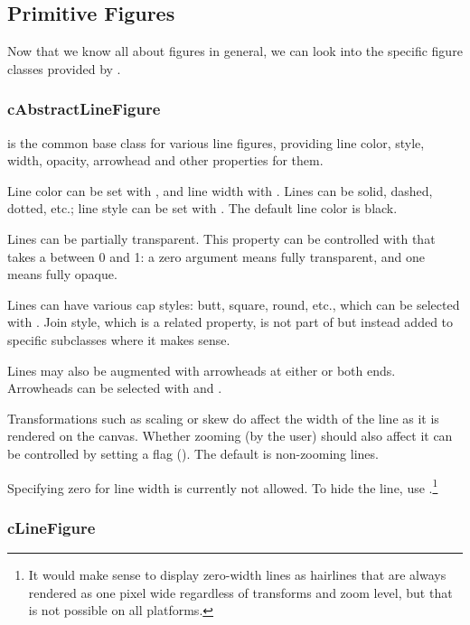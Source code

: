 \subsection{Primitive Figures}
\label{sec:graphics:primitive-figures}

Now that we know all about figures in general, we can look into the
specific figure classes provided by {\opp}.

\subsubsection{cAbstractLineFigure}
\label{sec:graphics:abstractlinefigure}

 is the common base class for various line
figures, providing line color, style, width, opacity, arrowhead and other
properties for them.

Line color can be set with , and line width with
. Lines can be solid, dashed, dotted, etc.; line
style can be set with . The default line color is
black.

Lines can be partially transparent. This property can be controlled with
 that takes a  between 0 and 1: a zero
argument means fully transparent, and one means fully opaque.

Lines can have various cap styles: butt, square, round, etc., which can be
selected with . Join style, which is a related
property, is not part of  but instead added to
specific subclasses where it makes sense.

Lines may also be augmented with arrowheads at either or both ends.
Arrowheads can be selected with  and
.

Transformations such as scaling or skew do affect the width of the line as it
is rendered on the canvas. Whether zooming (by the user) should also affect
it can be controlled by setting a flag ().
The default is non-zooming lines.

Specifying zero for line width is currently not allowed. To hide the line,
use .\footnote{It would make sense to display
zero-width lines as hairlines that are always rendered as one pixel wide
regardless of transforms and zoom level, but that is not possible on all
platforms.}


\subsubsection{cLineFigure}
\label{sec:graphics:linefigure}

